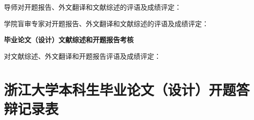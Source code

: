 \cleardoublepage

{
    \bfseries

    {
        \noindent 导师对开题报告、外文翻译和文献综述的评语及成绩评定：
    }

    \vspace{50mm}

    \thesisproposaleval[][][]

    \signature{导师签名}

    {
        \noindent 学院盲审专家对开题报告、外文翻译和文献综述的评语及成绩评定：
    }


    \mbox{} \vfill
    \thesisproposaleval
    \signature{开题报告审核负责人（签名/签章）}
}
{
    \begin{center}
            \bfseries {} 毕业论文（设计）文献综述和开题报告考核
    \end{center}
    \bfseries

    {
        \noindent 对文献综述、外文翻译和开题报告评语及成绩评定：
    }


    \mbox{} \vfill
    \thesisproposaleval
    \signature{开题报告答辩小组负责人（签名）}
}
{
\chapter*{浙江大学本科生毕业论文（设计）开题答辩记录表}
}
